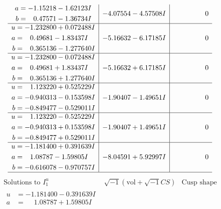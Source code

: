 \documentclass[1p]{elsarticle_modified}
\theoremstyle{definition}
\newcommand{\I}{\sqrt{-1}}
\begin{document}
$$\begin{array}{c|c|c}
\begin{aligned}
a &= -1.15218 - 1.62123 I \\
b &= \phantom{-}0.47571 - 1.36734 I\end{aligned}
 & -4.07554 - 4.57508 I & \phantom{-0.000000 } 0 \\ \hline\begin{aligned}
u &= -1.232800 + 0.072488 I \\
a &= \phantom{-}0.49681 - 1.83437 I \\
b &= \phantom{-}0.365136 - 1.277640 I\end{aligned}
 & -5.16632 - 6.17185 I & \phantom{-0.000000 } 0 \\ \hline\begin{aligned}
u &= -1.232800 - 0.072488 I \\
a &= \phantom{-}0.49681 + 1.83437 I \\
b &= \phantom{-}0.365136 + 1.277640 I\end{aligned}
 & -5.16632 + 6.17185 I & \phantom{-0.000000 } 0 \\ \hline\begin{aligned}
u &= \phantom{-}1.123220 + 0.525229 I \\
a &= -0.940313 - 0.153598 I \\
b &= -0.849477 - 0.529011 I\end{aligned}
 & -1.90407 - 1.49651 I & \phantom{-0.000000 } 0 \\ \hline\begin{aligned}
u &= \phantom{-}1.123220 - 0.525229 I \\
a &= -0.940313 + 0.153598 I \\
b &= -0.849477 + 0.529011 I\end{aligned}
 & -1.90407 + 1.49651 I & \phantom{-0.000000 } 0 \\ \hline\begin{aligned}
u &= -1.181400 + 0.391639 I \\
a &= \phantom{-}1.08787 - 1.59805 I \\
b &= -0.616078 - 0.970757 I\end{aligned}
 & -8.04591 + 5.92997 I & \phantom{-0.000000 } 0\\
 \hline 
 \end{array}$$\newpage$$\begin{array}{c|c|c}  
\text{Solutions to }I^u_{1}& \I (\text{vol} + \sqrt{-1}CS) & \text{Cusp shape}\\
 \hline 
\begin{aligned}
u &= -1.181400 - 0.391639 I \\
a &= \phantom{-}1.08787 + 1.59805 I \\

\end{aligned}
\end{array}$$
\end{document}
